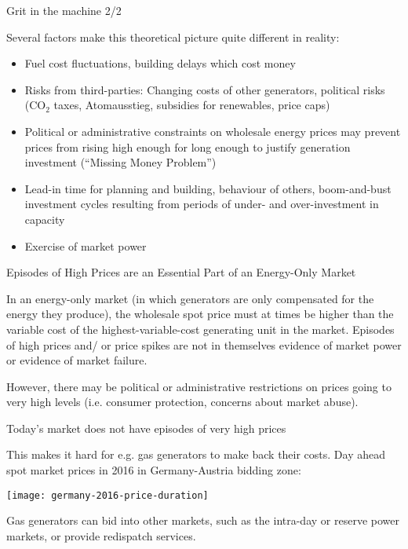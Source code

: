 \documentclass[10pt,dvipsnames]{beamer}
\def\co2{CO${}_2$}
\let\olditem\item
\renewcommand{\item}{%
\olditem\vspace{5pt}}
\begin{document}
\begin{frame}{Grit in the machine 2/2}

  Several factors make this theoretical picture quite different in reality:
  \begin{itemize}
    \item Fuel cost fluctuations, building delays which cost money
  \item Risks from third-parties:  Changing costs of other generators, political risks (\co2 taxes,  Atomausstieg, subsidies for renewables, price caps)
  \item Political or administrative constraints on wholesale energy
    prices may prevent prices from rising high enough for long enough
    to justify generation investment (``Missing Money Problem'')
  \item  Lead-in time for planning and building, behaviour of others, boom-and-bust investment cycles resulting from periods of under- and over-investment in capacity
    \item Exercise of \alert{market power}
  \end{itemize}

\end{frame}


\begin{frame}{Episodes of High Prices are an Essential Part of an Energy-Only Market}

  In an energy-only market (in which generators are only compensated
  for the energy they produce), the wholesale spot price must at times
  be higher than the variable cost of the highest-variable-cost
  generating unit in the market. Episodes of high prices and/ or price
  spikes are not in themselves evidence of market power or evidence of
  market failure.

  However, there may be political or administrative restrictions on
  prices going to very high levels (i.e. consumer protection, concerns about market abuse).




\end{frame}


\begin{frame}{Today's market does not have episodes of very high prices}

  This makes it hard for e.g. gas generators to make back their
  costs. Day ahead spot market prices in 2016 in Germany-Austria bidding zone:

  \centering
  \texttt{[image: germany-2016-price-duration]}

  \raggedright
  Gas generators can bid into other markets, such as the intra-day or
  reserve power markets, or provide redispatch services.



\end{frame}
\end{document}
